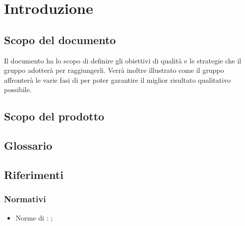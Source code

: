 \documentclass[PianoDiQualifica.tex]{subfiles}
\begin{document}
\section{Introduzione}
	\subsection{Scopo del documento}
		Il documento ha lo scopo di definire gli obiettivi di qualità e le strategie che il gruppo \GRUPPO{}
		adotterà per raggiungerli. Verrà inoltre illustrato come il gruppo affronterà le varie fasi di 
		per poter garantire il miglior risultato qualitativo possibile.
	\subsection{Scopo del prodotto}
		\SCOPO
	\subsection{Glossario}
		\GLOSSARIO
	\subsection{Riferimenti}
		\subsubsection{Normativi}
			\begin{itemize}
				\item Norme di : \NPdoc{};
			\end{itemize}
\end{document}
